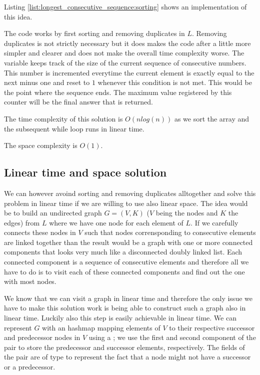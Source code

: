 Listing \ref{list:longest_consecutive_sequence:sorting} shows an implementation of this idea.




The code works by first sorting and removing duplicates in $L$. Removing duplicates is not strictly necessary but it does makes the code after a little more simpler and clearer and does not make the overall time complexity worse. The variable  keeps track of the size of the current sequence of consecutive numbers. This number is incremented everytime the current element is exactly equal to the next minus one and reset to $1$ whenever this condition is not met. This would be the point where the sequence ends. 
The maximum value registered by this counter will be the final answer that is returned.

The time complexity of this solution is $O(n log(n))$ as we sort the array and the subsequent while loop runs in linear time. 

The space complexity is $O(1)$.

\subsection{Linear time and space solution}
\label{longest_consecutive_sequence:sec:lineartime}
We can however avoind sorting and removing duplicates alltogether and solve this problem in linear time if we are willing to use also linear space.
The idea would be to build an undirected graph $G=(V,K)$ ($V$ being the nodes and $K$ the edges) from $L$ where we have one node for each element of $L$.
If we carefully connects these nodes in $V$ such that nodes corrensponding to consecutive elements are linked together than the result would be a graph with one or more connected components that looks very much like a disconnected doubly linked list.
Each connected component is a sequence of consecutive elements and therefore all we have to do is to visit each of these connected components and find out the one with most nodes.

We know that we can visit a graph in linear time and therefore the only issue we have to make this solution work is being able to construct such a 
graph also in linear time. 
Luckily also this step is easily achievable in linear time. 
We can represent $G$ with an hashmap mapping elements of $V$ to their respective successor and predecessor nodes in $V$ using a ; we use the first and second component of the pair to store the predecessor and successor elements, respectively. 
The fields of the pair are of type  to represent the fact that a node might not have a successor or a predecessor.

